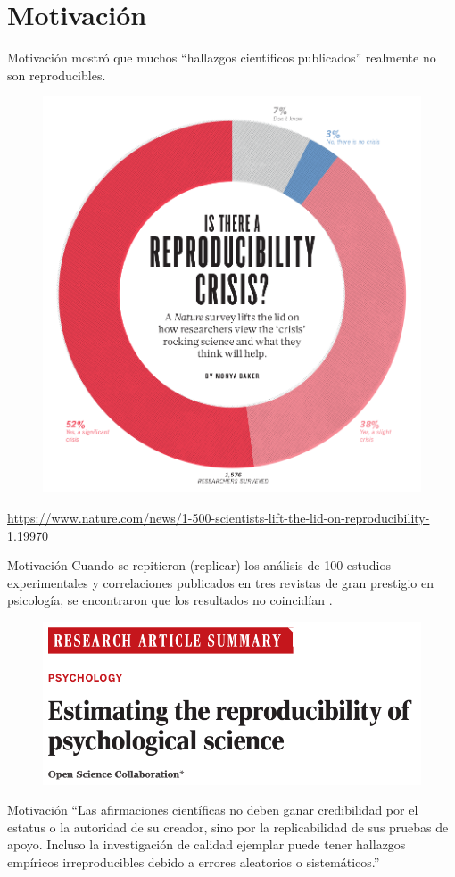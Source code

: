 \documentclass{beamer}
\begin{document}
\section{Motivación}
\begin{frame}{Motivación}
\citeauthor{Baker2016} \citeyear{Baker2016} mostró que muchos ``hallazgos científicos publicados'' realmente no son reproducibles.
\vspace{0.5cm}
\begin{figure}
\includegraphics[width=.4\textwidth]{rc.png}
\end{figure}
\tiny
\textcolor{blue}{\url{https://www.nature.com/news/1-500-scientists-lift-the-lid-on-reproducibility-1.19970}}
\end{frame}

\begin{frame}{Motivación}
Cuando se repitieron (replicar) los análisis de 100 estudios experimentales y correlaciones publicados en tres revistas de gran prestigio en psicología, se encontraron que los resultados no coincidían \cite{Open2015}.
\vspace{0.5cm}
\begin{figure}
\includegraphics[width=.7\textwidth]{OSC.png}
\end{figure}
\end{frame}

\begin{frame}{Motivación}
``Las afirmaciones científicas no deben ganar credibilidad por el estatus o la autoridad de su creador, sino por la replicabilidad de sus pruebas de apoyo. Incluso la investigación de calidad ejemplar puede tener hallazgos empíricos irreproducibles debido a errores aleatorios o sistemáticos.''
\end{frame}
\end{document}
